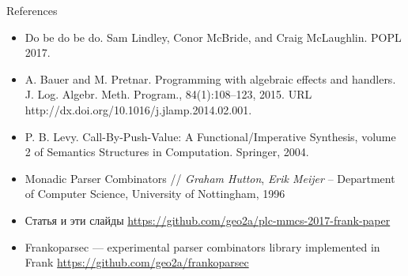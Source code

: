 \begin{frame}{References}

\begin{itemize}
  \item Do be do be do. Sam Lindley, Conor McBride, and Craig McLaughlin. POPL 2017.
  \item A. Bauer and M. Pretnar. Programming with algebraic effects and handlers. J. Log. Algebr. Meth. Program., 84(1):108–123, 2015. URL http://dx.doi.org/10.1016/j.jlamp.2014.02.001.
  \item P. B. Levy. Call-By-Push-Value: A Functional/Imperative Synthesis, volume 2 of Semantics Structures in Computation. Springer, 2004.
  \item Monadic Parser Combinators // \textit{Graham Hutton}, \textit{Erik Meijer} – Department of Computer Science, University of Nottingham, 1996
  \item Статья и эти слайды \url{https://github.com/geo2a/plc-mmcs-2017-frank-paper}
  \item Frankoparsec --- experimental parser combinators library implemented in Frank \url{https://github.com/geo2a/frankoparsec}
\end{itemize}

\end{frame}


